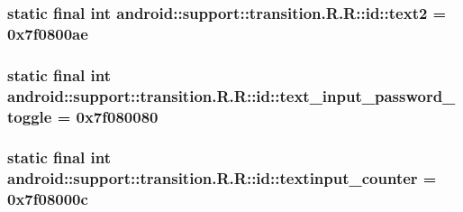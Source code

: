 \hypertarget{classandroid_1_1support_1_1transition_1_1_r_1_1id_aa271873f4763a8a262be52f5e553420}{
\subsubsection[{text2}]{\setlength{\rightskip}{0pt plus 5cm}static final int android::support::transition.R.R::id::text2 = 0x7f0800ae}}
\label{classandroid_1_1support_1_1transition_1_1_r_1_1id_aa271873f4763a8a262be52f5e553420}


\hypertarget{classandroid_1_1support_1_1transition_1_1_r_1_1id_77c008faeda32b2c50009e18cdc1bdff}{
\subsubsection[{text\_\-input\_\-password\_\-toggle}]{\setlength{\rightskip}{0pt plus 5cm}static final int android::support::transition.R.R::id::text\_\-input\_\-password\_\-toggle = 0x7f080080}}
\label{classandroid_1_1support_1_1transition_1_1_r_1_1id_77c008faeda32b2c50009e18cdc1bdff}


\hypertarget{classandroid_1_1support_1_1transition_1_1_r_1_1id_248065f6e9f1b08e94fe6b8eadb35880}{
\subsubsection[{textinput\_\-counter}]{\setlength{\rightskip}{0pt plus 5cm}static final int android::support::transition.R.R::id::textinput\_\-counter = 0x7f08000c}}
\label{classandroid_1_1support_1_1transition_1_1_r_1_1id_248065f6e9f1b08e94fe6b8eadb35880}


